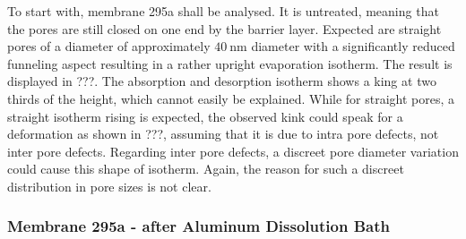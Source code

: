 \documentclass[thesis.tex]{subfiles}
\begin{document}
            To start with, membrane 295a shall be analysed. It is untreated, meaning that the pores are still closed on one end by the barrier layer. Expected are straight pores of a diameter of approximately
            $\SI{40}{\nano\meter}$ diameter with a significantly reduced funneling aspect resulting in a rather upright evaporation isotherm. The result is displayed in ???. The absorption and desorption isotherm shows a king at two thirds of the height, which cannot easily be explained. While for straight pores, a straight isotherm rising is expected, the observed kink could speak for a deformation as shown in ???, assuming that it is due to intra pore defects, not inter pore defects. Regarding inter pore defects, a discreet pore diameter variation could cause this shape of isotherm. Again, the reason for such a discreet distribution in pore sizes is not clear.


            \subsubsection{Membrane 295a - after Aluminum Dissolution Bath}
\end{document}
